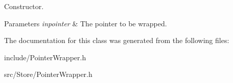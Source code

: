 Constructor. 


\begin{DoxyParams}{Parameters}
{\em inpointer} & The pointer to be wrapped. \\
\hline
\end{DoxyParams}


The documentation for this class was generated from the following files\-:\begin{DoxyCompactItemize}
\item 
include/Pointer\-Wrapper.\-h\item 
src/\-Store/Pointer\-Wrapper.\-h\end{DoxyCompactItemize}
